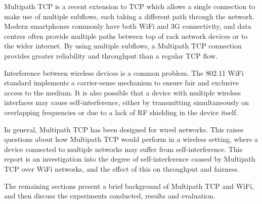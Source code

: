 Multipath TCP is a recent extension to TCP which allows a single connection to make use of multiple subflows, each taking a different path through the network. Modern smartphones commonly  have both WiFi and 3G connectivity, and data centres often provide multiple paths between top of rack network devices or to the wider internet. By using multiple subflows, a Multipath TCP connection provides greater reliability and throughput than a regular TCP flow.

Interference between wireless devices is a common problem. The 802.11 WiFi standard implements a carrier-sense mechanism to ensure fair and exclusive access to the medium. It is also possible that a device with multiple wireless interfaces may cause self-interference, either by transmitting simultaneously on overlapping frequencies or due to a lack of RF shielding in the device itself.

In general, Multipath TCP has been designed for wired networks. This raises questions about how Multipath TCP would perform in a wireless setting, where a device connected to multiple networks may suffer from self-interference. This report is an investigation into the degree of self-interference caused by Multipath TCP over WiFi networks, and the effect of this on throughput and fairness.

The remaining sections present a brief background of Multipath TCP and WiFi, and then discuss the experiments conducted, results and evaluation.